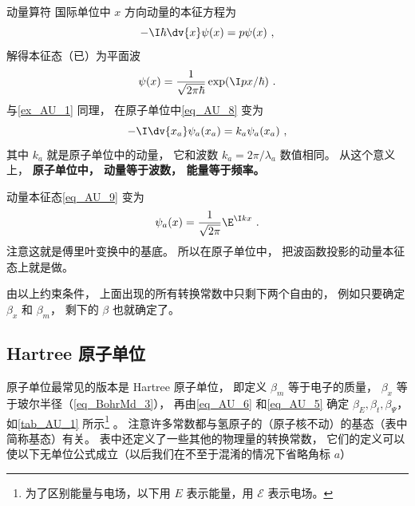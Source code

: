 \begin{example}{动量算符}\label{ex_AU_2}
国际单位中 $x$ 方向动量的本征方程为
\begin{equation}\label{eq_AU_8}
-\I\hbar \dv{x} \psi(x) = p \psi(x)~,
\end{equation}
解得本征态（已）为平面波
\begin{equation}\label{eq_AU_9}
\psi(x) = \frac{1}{\sqrt{2\pi\hbar}}\exp(\I p x/\hbar)~.
\end{equation}
与\autoref{ex_AU_1} 同理， 在原子单位中\autoref{eq_AU_8} 变为
\begin{equation}
-\I\dv{x_a} \psi_a(x_a) = k_a \psi_a(x_a)~,
\end{equation}
其中 $k_a$ 就是原子单位中的动量， 它和波数 $k_a = 2\pi/\lambda_a$ 数值相同。 从这个意义上， \textbf{原子单位中， 动量等于波数， 能量等于频率。}

动量本征态\autoref{eq_AU_9} 变为
\begin{equation}
\psi_a(x) = \frac{1}{\sqrt{2\pi}}\E^{\I kx}~.
\end{equation}
注意这就是傅里叶变换中的基底。 所以在原子单位中， 把波函数投影的动量本征态上就是做。
\end{example}

由以上约束条件， 上面出现的所有转换常数中只剩下两个自由的， 例如只要确定 $\beta_x$ 和 $\beta_m$， 剩下的 $\beta$ 也就确定了。

\subsection{Hartree 原子单位}
原子单位最常见的版本是 Hartree 原子单位， 即定义 $\beta_m$ 等于电子的质量， $\beta_x$ 等于玻尔半径（\autoref{eq_BohrMd_3}）， 再由\autoref{eq_AU_6} 和\autoref{eq_AU_5} 确定 $\beta_E, \beta_t, \beta_\Psi$， 如\autoref{tab_AU_1} 所示\footnote{为了区别能量与电场，以下用 $E$ 表示能量，用 $\mathcal{E}$ 表示电场。} 。 注意许多常数都与氢原子的（原子核不动）的基态（表中简称基态）有关。 表中还定义了一些其他的物理量的转换常数， 它们的定义可以使以下无单位公式成立（以后我们在不至于混淆的情况下省略角标 $a$）

